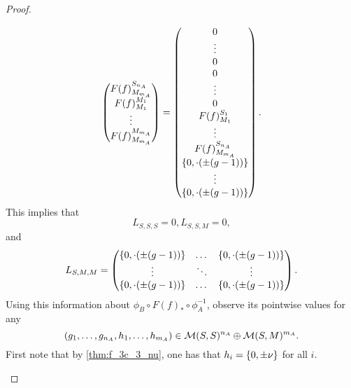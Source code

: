 \begin{proof}
\begin{enumerate}
{\[\begin{pmatrix}
                    F(f)_{M_{m_A}}^{S_{n_A}} \\
                    F(f)_{M_1}^{M_1} \\
                    \vdots \\
                    F(f)_{M_{m_A}}^{M_{m_A}}
                \end{pmatrix}
                = \begin{pmatrix}
                    0 \\
                    \vdots \\
                    0 \\
                    0 \\
                    \vdots \\
                    0 \\
                    F(f)_{M_1}^{S_1} \\
                    \vdots \\
                    F(f)_{M_{m_A}}^{S_{n_A}} \\
                    \left\{ 0, \cdot(\pm(g - 1)) \right\} \\
                    \vdots \\
                    \left\{ 0, \cdot(\pm(g - 1)) \right\}
                \end{pmatrix}.
            \]
            This implies that
            \[
                L_{S, S, S} = 0, L_{S, S, M} = 0,
            \]
            and
            \[
                L_{S, M, M} =
                \begin{pmatrix}
                    \left\{ 0, \cdot(\pm(g - 1)) \right\} & \dots & \left\{ 0, \cdot(\pm(g - 1)) \right\} \\
                    \vdots & \ddots & \vdots \\
                    \left\{ 0, \cdot(\pm(g - 1)) \right\} & \dots & \left\{ 0, \cdot(\pm(g - 1)) \right\}
                \end{pmatrix}.
            \]
            Using this information about \( \phi_B \circ F(f)_* \circ \phi_A^{-1} \), observe its pointwise values for any 
            \[
                \left( g_1, \dots, g_{n_A}, h_1, \dots, h_{m_A} \right) \in {\mathcal{M}}(S, S)^{n_A} \oplus {\mathcal{M}}(S, M)^{m_A}.
            \]
            First note that by \autoref{thm:f_3c_3_nu}, one has that \( h_i = \left\{ 0, \pm \nu \right\} \) for all \( i \).

}
\end{enumerate}
\end{proof}
